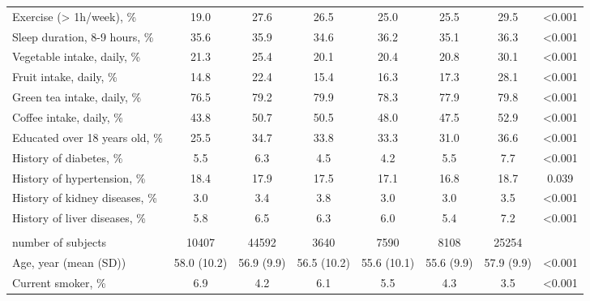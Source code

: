 \documentclass[nutrients,article,submit,moreauthors,pdftex]{mdpi}
\begin{document}
\begin{table}[h]
{\begin{tabular}[t]{lccccccc}
\hspace{1em}Exercise (> 1h/week), \% & 19.0 & 27.6 & 26.5 & 25.0 & 25.5 & 29.5 & <0.001\\
\rowcolor{gray!6}  \hspace{1em}Sleep duration, 8-9 hours, \% & 35.6 & 35.9 & 34.6 & 36.2 & 35.1 & 36.3 & <0.001\\
\hspace{1em}Vegetable intake, daily, \% & 21.3 & 25.4 & 20.1 & 20.4 & 20.8 & 30.1 & <0.001\\
\rowcolor{gray!6}  \hspace{1em}Fruit intake, daily, \% & 14.8 & 22.4 & 15.4 & 16.3 & 17.3 & 28.1 & <0.001\\
\hspace{1em}Green tea intake, daily, \% & 76.5 & 79.2 & 79.9 & 78.3 & 77.9 & 79.8 & <0.001\\
\rowcolor{gray!6}  \hspace{1em}Coffee intake, daily, \% & 43.8 & 50.7 & 50.5 & 48.0 & 47.5 & 52.9 & <0.001\\
\hspace{1em}Educated over 18 years old, \% & 25.5 & 34.7 & 33.8 & 33.3 & 31.0 & 36.6 & <0.001\\
\rowcolor{gray!6}  \hspace{1em}History of diabetes, \% & 5.5 & 6.3 & 4.5 & 4.2 & 5.5 & 7.7 & <0.001\\
\hspace{1em}History of hypertension, \% & 18.4 & 17.9 & 17.5 & 17.1 & 16.8 & 18.7 & 0.039\\
\rowcolor{gray!6}  \hspace{1em}History of kidney diseases, \% & 3.0 & 3.4 & 3.8 & 3.0 & 3.0 & 3.5 & <0.001\\
\hspace{1em}History of liver diseases, \% & 5.8 & 6.5 & 6.3 & 6.0 & 5.4 & 7.2 & <0.001\\
\rowcolor{gray!6}  \addlinespace[0.3em]
\multicolumn{8}{l}{\textbf{Women (n = 545999)}}\\
\hspace{1em}number of subjects & 10407 & 44592 & 3640 & 7590 & 8108 & 25254 & \\
\hspace{1em}Age, year (mean (SD)) & 58.0 (10.2) & 56.9 (9.9) & 56.5 (10.2) & 55.6 (10.1) & 55.6 (9.9) & 57.9 (9.9) & <0.001\\
\rowcolor{gray!6}  \hspace{1em}Current smoker, \% & 6.9 & 4.2 & 6.1 & 5.5 & 4.3 & 3.5 & <0.001\\

\end{tabular}}
\end{table}
\end{document}
